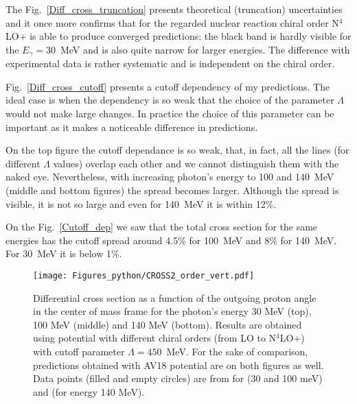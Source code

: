     The Fig.~\ref{Diff_cross_truncation} 
    presents theoretical (truncation) uncertainties and it once more
    confirms that for the regarded nuclear reaction chiral order
    N$^4$LO+ is able to produce converged predictions: 
    the black band is hardly visible for the $E_\gamma=30$~MeV 
    and is also quite narrow for larger energies. 
    The difference with experimental data is rather systematic 
    and is independent on the chiral order. 

    Fig.~\ref{Diff_cross_cutoff} presents a cutoff dependency
    of my predictions. The ideal case is when the dependency is so weak that
    the choice of the parameter $\Lambda$ would not make large 
    changes. In practice the choice of this parameter can be 
    important as it makes a noticeable difference in predictions.
    
    On the top figure the cutoff dependance is so weak,
    that, in fact, all the lines (for different $\Lambda$ values)
    overlap each other and we cannot distinguish them with the naked eye.
    Nevertheless, with increasing photon's energy to 100 and 140~MeV 
    (middle and bottom figures) the spread becomes larger. 
    Although the spread is visible, it is not so large and even for 140~MeV
    it is within 12\%. 

    On the Fig.~\ref{Cutoff_dep} we saw that the total
    cross section for the same energies has the cutoff spread
    around 4.5\% for 100~MeV and 8\% for 140~MeV. For 30~MeV it is below 1\%.  
    

    \begin{figure}[h]
        \begin{center}
        \texttt{[image: Figures\_python/CROSS2\_order\_vert.pdf]}
        \end{center}
        \caption{Differential cross section as a function of the outgoing proton angle in the center of mass frame 
        for the photon's energy 30 MeV (top), 100 MeV (middle) and 140 MeV (bottom). Results are obtained using potential
        with different chiral orders (from LO to N$^4$LO+) with cutoff parameter $\Lambda=450$~MeV.
        For the sake of comparison, predictions obtained with AV18 potential are on both figures as well.
        Data points (filled and empty circles) are from \cite{Ying_Experiment_Deut}
        for (30 and 100 meV)
        and \cite{DeSanctis_Experiment_Deut} (for energy 140 MeV).}
        \label{Diff_cross_order}
    \end{figure}

